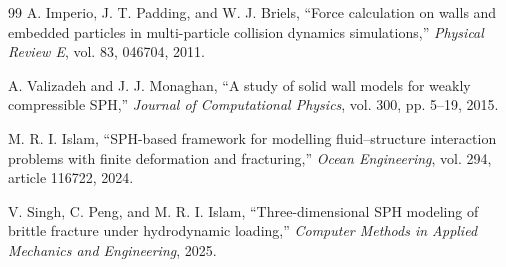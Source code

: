 \documentclass[11pt,a4paper]{article}
\begin{document}
\begin{thebibliography}{99}
A. Imperio, J. T. Padding, and W. J. Briels,
``Force calculation on walls and embedded particles in multi-particle collision dynamics simulations,''
\emph{Physical Review E}, vol. 83, 046704, 2011.

A. Valizadeh and J. J. Monaghan,
``A study of solid wall models for weakly compressible SPH,''
\emph{Journal of Computational Physics}, vol. 300, pp. 5--19, 2015.

M. R. I. Islam,
``SPH-based framework for modelling fluid--structure interaction problems with finite deformation and fracturing,''
\emph{Ocean Engineering}, vol. 294, article 116722, 2024.

V. Singh, C. Peng, and M. R. I. Islam,
``Three-dimensional SPH modeling of brittle fracture under hydrodynamic loading,''
\emph{Computer Methods in Applied Mechanics and Engineering}, 2025.

\end{thebibliography}
\end{document}
